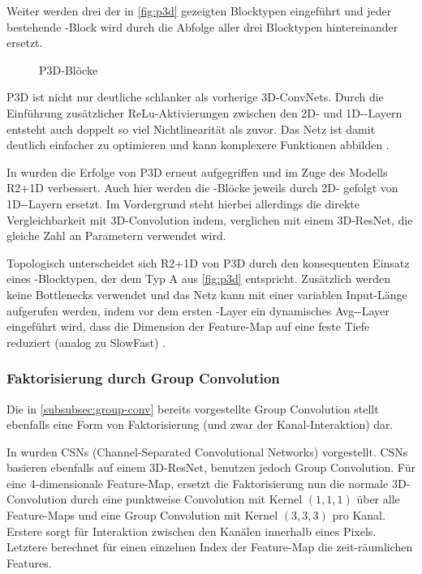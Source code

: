 Weiter werden drei der in \autoref{fig:p3d} gezeigten Blocktypen eingeführt und jeder bestehende \res-Block wird durch die Abfolge aller drei Blocktypen hintereinander ersetzt.

\begin{figure}[h!]
    \centering
    \caption{P3D-Blöcke}
    \label{fig:p3d}
\end{figure}

P3D ist nicht nur deutliche schlanker als vorherige 3D-ConvNets.
Durch die Einführung zusätzlicher ReLu-Aktivierungen zwischen den 2D- und 1D-\conv-Layern entsteht auch doppelt so viel Nichtlinearität als zuvor.
Das Netz ist damit deutlich einfacher zu optimieren und kann komplexere Funktionen abbilden \cite{Tran18}.

In \cite{Tran18} wurden die Erfolge von P3D erneut aufgegriffen und im Zuge des Modells R2+1D verbessert.
Auch hier werden die \res-Blöcke jeweils durch 2D- gefolgt von 1D-\conv-Layern ersetzt.
Im Vordergrund steht hierbei allerdings die direkte Vergleichbarkeit mit 3D-Convolution indem, verglichen mit einem 3D-ResNet, die gleiche Zahl an Parametern verwendet wird.

Topologisch unterscheidet sich R2+1D von P3D durch den konsequenten Einsatz eines \res-Blocktypen, der dem Typ A aus \autoref{fig:p3d} entspricht.
Zusätzlich werden keine Bottlenecks verwendet und das Netz kann mit einer variablen Input-Länge aufgerufen werden, indem vor dem ersten \fc-Layer ein dynamisches Avg-\pool-Layer eingeführt wird, dass die Dimension der Feature-Map auf eine feste Tiefe reduziert (analog zu SlowFast) .

\subsubsection{Faktorisierung durch Group Convolution}

Die in \autoref{subsubsec:group-conv} bereits vorgestellte Group Convolution stellt ebenfalls eine Form von Faktorisierung (und zwar der Kanal-Interaktion) dar.

In \cite{Tran19} wurden CSNs (Channel-Separated Convolutional Networks) vorgestellt.
CSNs basieren ebenfalls auf einem 3D-ResNet, benutzen jedoch Group Convolution.
Für eine 4-dimensionale Feature-Map, ersetzt die Faktorisierung nun die normale 3D-Convolution durch eine punktweise Convolution mit Kernel $(1, 1, 1)$ über alle Feature-Maps und eine Group Convolution mit Kernel $(3, 3, 3)$ pro Kanal.
Erstere sorgt für Interaktion zwischen den Kanälen innerhalb eines Pixels.
Letztere berechnet für einen einzelnen Index der Feature-Map die zeit-räumlichen Features.

